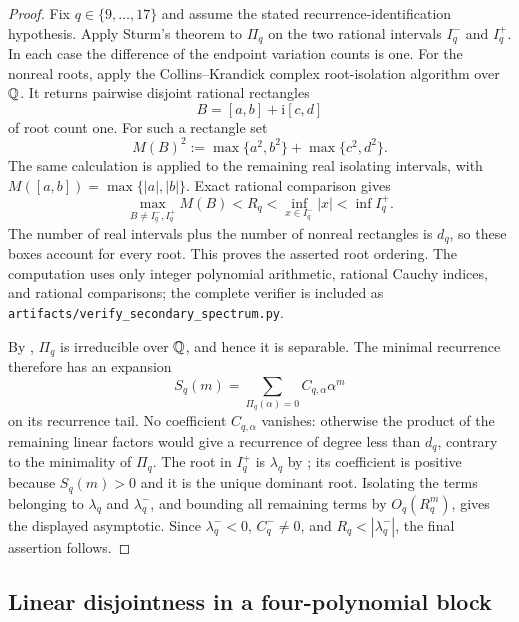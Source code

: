 \begin{proof}
Fix \(q\in\{9,\dots,17\}\) and assume the stated recurrence-identification
hypothesis.  Apply Sturm's theorem to \(\Pi_q\) on the two
rational intervals \(I_q^-\) and \(I_q^+\).  In each case the difference of
the endpoint variation counts is one.  For the nonreal roots, apply the
Collins--Krandick complex root-isolation algorithm over \(\mathbb{Q}\).  It returns
pairwise disjoint rational rectangles
\[
  B=[a,b]+\mathrm i[c,d]
\]
of root count one.  For such a rectangle set
\[
  M(B)^2:=\max\{a^2,b^2\}+\max\{c^2,d^2\}.
\]
The same calculation is applied to the remaining real isolating intervals,
with \(M([a,b])=\max\{|a|,|b|\}\).  Exact rational comparison gives
\[
  \max_{B\ne I_q^-,I_q^+}M(B)<R_q
  <\inf_{x\in I_q^-}|x|<\inf I_q^+.
\]
The number of real intervals plus the number of nonreal rectangles is
\(d_q\), so these boxes account for every root.  This proves the asserted
root ordering.  The computation uses only integer polynomial arithmetic,
rational Cauchy indices, and rational comparisons; the complete verifier is
included as \texttt{artifacts/verify\_secondary\_spectrum.py}.

By , \(\Pi_q\) is irreducible over \(\mathbb{Q}\), and hence
it is separable.  The minimal recurrence therefore has an expansion
\[
  S_q(m)=\sum_{\Pi_q(\alpha)=0}C_{q,\alpha}\alpha^m
\]
on its recurrence tail.  No coefficient \(C_{q,\alpha}\) vanishes: otherwise
the product of the remaining linear factors would give a recurrence of degree
less than \(d_q\), contrary to the minimality of \(\Pi_q\).  The root in
\(I_q^+\) is \(\lambda_q\) by
; its coefficient is
positive because \(S_q(m)>0\) and it is the unique dominant root.  Isolating
the terms belonging to \(\lambda_q\) and \(\lambda_q^-\), and bounding all
remaining terms by \(O_q(R_q^m)\), gives the displayed asymptotic.  Since
\(\lambda_q^-<0\), \(C_q^-\ne0\), and \(R_q<|\lambda_q^-|\), the final
assertion follows.
\end{proof}

\subsection{Linear disjointness in a four-polynomial block}

